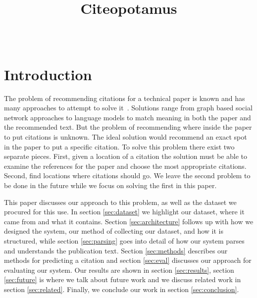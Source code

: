 \documentclass[10pt, conference, compsocconf]{IEEEtran}
\begin{document}
\title{Citeopotamus}


\author{
\\
}

\maketitle

\thispagestyle{empty}
\pagestyle{empty}

\section{Introduction}\label{sec:introduction}
The problem of recommending citations for a technical paper is known and has
many approaches to attempt to solve it~\cite{cite1, cite2, cite3, cite4, cite5,
cite6, cite7, cite8}. Solutions range from graph based social network
approaches to language models to match meaning in both the paper and the
recommended text. But the problem of recommending where inside the paper to put
citations is unknown.  The ideal solution would recommend an exact spot in the
paper to put a specific citation. To solve this problem there exist two
separate pieces. First, given a location of a citation the solution must be
able to examine the references for the paper and choose the most appropriate
citations.  Second, find locations where citations should go. We leave the
second problem to be done in the future while we focus on solving the first in
this paper.

This paper discusses our approach to this problem, as well as the dataset we
procured for this use. In section \ref{sec:dataset} we highlight our dataset,
where it came from and what it contains. Section \ref{sec:architecture} follows
up with how we designed the system, our method of collecting our dataset, and
how it is structured, while section \ref{sec:parsing} goes into detail of how
our system parses and understands the publication text. Section
\ref{sec:methods} describes our methods for predicting a citation and section
\ref{sec:eval} discusses our approach for evaluating our system. Our results
are shown in section \ref{sec:results}, section \ref{sec:future} is where we
talk about future work and we discuss related work in section
\ref{sec:related}. Finally, we conclude our work in section
\ref{sec:conclusion}.
\end{document}
